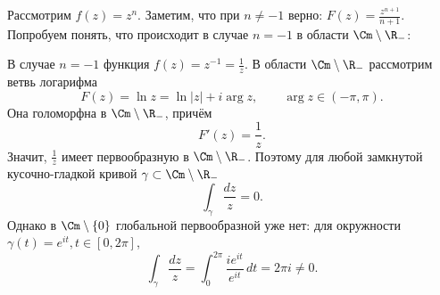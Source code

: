 \begin{example}
    Рассмотрим \(f(z) = z^n\). Заметим, что при \(n \ne -1\) верно: \(F(z) = \frac{z^{n + 1}}{n + 1}\). Попробуем понять, что происходит в случае \(n = -1\) в области \(\Cm \setminus \R_-\):

    В случае \(n=-1\) функция \(f(z)=z^{-1}=\frac1z\). В области \(\Cm \setminus \R_-\) рассмотрим ветвь логарифма
\[
    F(z)=\ln z=\ln|z|+i\arg z,\qquad \arg z\in(-\pi,\pi).
\]
Она голоморфна в \(\Cm \setminus \R_-\), причём
\[
    F'(z)=\frac1z.
\]
Значит, \(\frac1z\) имеет первообразную в \(\Cm \setminus \R_-\). Поэтому для любой замкнутой кусочно-гладкой кривой \(\gamma\subset \Cm \setminus \R_-\)
\[
    \int_\gamma \frac{dz}{z}=0.
\]
Однако в \(\Cm\setminus\{0\}\) глобальной первообразной уже нет: для окружности \(\gamma(t)=e^{it}, t\in[0,2\pi]\),
\[
    \int_\gamma \frac{dz}{z}
    =
    \int_0^{2\pi}\frac{ie^{it}}{e^{it}}\,dt
    =
    2\pi i\ne 0.
\]
\end{example}


